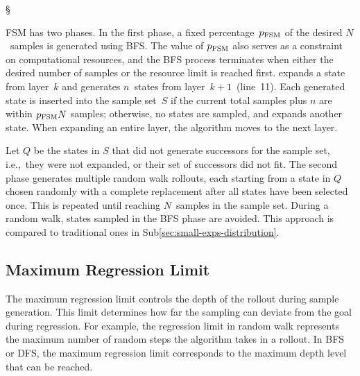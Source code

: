 \begin{algorithm}[tb]
{        

        \Return \S \\
    }
\end{algorithm}

FSM has two phases. In the first phase, a fixed percentage~$p_\text{FSM}$ of the desired $N$~samples is generated using BFS. The value of $p_\text{FSM}$ also serves as a constraint on computational resources, and the BFS process terminates when either the desired number of samples or the resource limit is reached first. \bfs expands a state from layer~$k$ and generates $n$~states from layer~$k+1$~(line~11). Each generated state is inserted into the sample set~$S$ if the current total samples plus $n$ are within $p_{\text{FSM}}N$ samples; otherwise, no states are sampled, and \bfs expands another state. When expanding an entire layer, the algorithm moves to the next layer.

Let $Q$ be the states in $S$ that did not generate successors for the sample set, i.e.,~they were not expanded, or their set of successors did not fit. The second phase generates multiple random walk rollouts, each starting from a state in $Q$ chosen randomly with a complete replacement after all states have been selected once. This is repeated until reaching $N$~samples in the sample set. During a random walk, states sampled in the BFS phase are avoided. This approach is compared to traditional ones in Sub\cref{sec:small-exps-distribution}.

\subsection{Maximum Regression Limit}
\label{sec:rollout-limit}

The maximum regression limit controls the depth of the rollout during sample generation. This limit determines how far the sampling can deviate from the goal during regression. For example, the regression limit in random walk represents the maximum number of random steps the algorithm takes in a rollout. In BFS or DFS, the maximum regression limit corresponds to the maximum depth level that can be reached.

